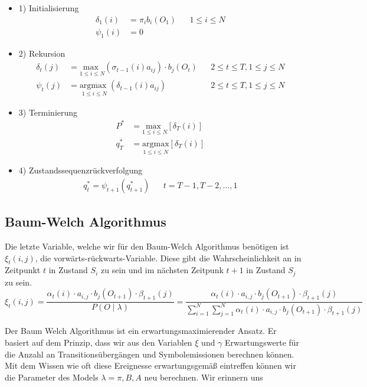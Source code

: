 \begin{itemize}
    \item 1) Initialisierung
    \begin{align*}
        \delta_1(i)  & = \pi_i b_i(O_1) && 1 \leq i \leq N \\
        \psi_1(i) & = 0
    \end{align*}
    \item 2) Rekursion
    \begin{align*}
        \delta_t(j) & = \underset{1 \leq i \leq N}{\text{max }} (\sigma_{t-1}(i)a_{ij}) \cdot b_j(O_t) && 2 \leq t \leq T, 1 \leq j \leq N \\
        \psi_t(j) & = \underset{1 \leq i \leq N}{\text{argmax }} (\delta_{t-1}(i)a_{ij}) && 2 \leq t \leq T, 1 \leq j \leq N
    \end{align*}
    \item 3) Terminierung
    \begin{align*}
        P^* & = \underset{1 \leq i \leq N}{\text{max }} [\delta_T(i)] \\
        q_T^* & = \underset{1 \leq i \leq N}{\text{argmax}} [\delta_T(i)]
    \end{align*}
    \item 4) Zustandssequenzrückverfolgung
    \begin{align*}
        q^*_t = \psi_{t+1}(q^*_{t+1}) && t = T - 1, T - 2, \dots, 1
    \end{align*}
\end{itemize}


\subsection{Baum-Welch Algorithmus}
Die letzte Variable, welche wir für den Baum-Welch Algorithmus benötigen ist $\xi_t(i, j)$, die vorwärts-rückwarts-Variable. Diese gibt die Wahrscheinlichkeit an in Zeitpunkt $t$ in Zustand $S_i$ zu sein und im nächsten Zeitpunk $t+1$ in Zustand $S_j$ zu sein.
\begin{equation}
\xi_t(i, j)
= \frac{\alpha_t(i) \cdot a_{i,j} \cdot b_j(O_{t+1}) \cdot \beta_{t+1}(j)}{P(O \mid \lambda)}
= \frac{\alpha_t(i) \cdot a_{i,j} \cdot b_j(O_{t+1}) \cdot \beta_{t+1}(j)}
        {\sum_{i=1}^{N} \sum_{j=1}^{N} \alpha_t(i) \cdot a_{i,j} \cdot b_j(O_{t+1}) \cdot \beta_{t+1}(j)}
\end{equation}

Der Baum Welch Algorithmus ist ein erwartungsmaximierender Ansatz. Er basiert auf dem Prinzip, dass wir aus den Variablen $\xi$ und $\gamma$
Erwartungswerte für die Anzahl an Transitionsübergängen und Symbolemissionen berechnen können. Mit dem Wissen wie oft diese Ereignesse erwartungsgemäß eintreffen können wir die Parameter des Models $\lambda = \pi, B, A$ neu berechnen. Wir erinnern uns

